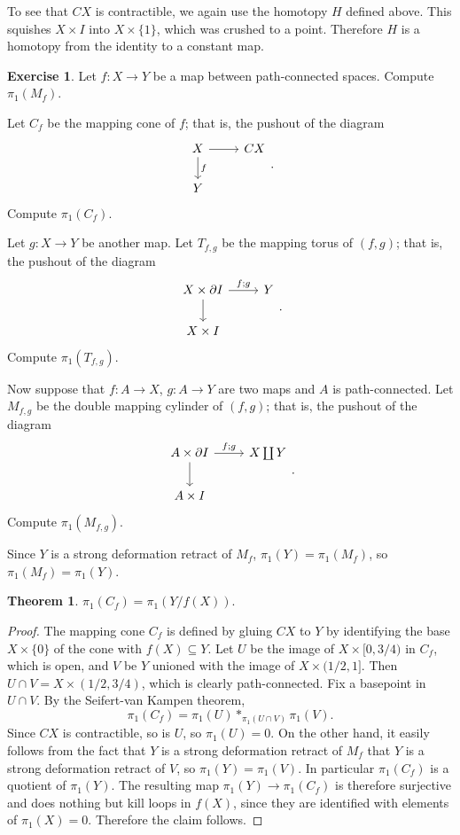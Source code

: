 \documentclass[10pt]{article}
\theoremstyle{definition}
\newtheorem{exer}{Exercise}
\newtheorem{theorem}[lemma]{Theorem}
\begin{document}
To see that $CX$ is contractible, we again use the homotopy $H$ defined above. This squishes $X \times I$ into $X \times \{1\}$, which was crushed to a point. Therefore $H$ is a homotopy from the identity to a constant map.

\begin{exer}
Let $f: X \to Y$ be a map between path-connected spaces. Compute $\pi_1(M_f)$.

Let $C_f$ be the mapping cone of $f$; that is, the pushout of the diagram
$$\begin{tikzcd}X \arrow[r] \arrow[d,"f"] & CX\\ Y\end{tikzcd}.$$
Compute $\pi_1(C_f)$.

Let $g: X \to Y$ be another map. Let $T_{f,g}$ be the mapping torus of $(f,g)$; that is, the pushout of the diagram
$$\begin{tikzcd}
X \times \partial I \arrow[r,"f;g"] \arrow[d] & Y\\
X \times I\end{tikzcd}.$$
Compute $\pi_1(T_{f,g})$.

Now suppose that $f: A \to X$, $g: A \to Y$ are two maps and $A$ is path-connected. Let $M_{f,g}$ be the double mapping cylinder of $(f,g)$; that is, the pushout of the diagram
$$\begin{tikzcd}
A \times \partial I \arrow[r,"f;g"] \arrow[d] & X \coprod Y \\
A \times I\end{tikzcd}.$$
Compute $\pi_1(M_{f,g})$.
\end{exer}

Since $Y$ is a strong deformation retract of $M_f$, $\pi_1(Y) = \pi_1(M_f)$, so $\pi_1(M_f) = \pi_1(Y)$.

\begin{theorem}
$\pi_1(C_f) = \pi_1(Y/f(X))$.
\end{theorem}
\begin{proof}
The mapping cone $C_f$ is defined by gluing $CX$ to $Y$ by identifying the base $X \times \{0\}$ of the cone with $f(X) \subseteq Y$.
Let $U$ be the image of $X \times [0, 3/4)$ in $C_f$, which is open, and $V$ be $Y$ unioned with the image of $X \times (1/2, 1]$.
Then $U \cap V = X \times (1/2, 3/4)$, which is clearly path-connected. Fix a basepoint in $U \cap V$.
By the Seifert-van Kampen theorem,
$$\pi_1(C_f) = \pi_1(U) *_{\pi_1(U \cap V)} \pi_1(V).$$
Since $CX$ is contractible, so is $U$, so $\pi_1(U) = 0$.
On the other hand, it easily follows from the fact that $Y$ is a strong deformation retract of $M_f$ that $Y$ is a strong deformation retract of $V$, so $\pi_1(Y) = \pi_1(V)$.
In particular $\pi_1(C_f)$ is a quotient of $\pi_1(Y)$.
The resulting map $\pi_1(Y) \to \pi_1(C_f)$ is therefore surjective and does nothing but kill loops in $f(X)$, since they are identified with elements of $\pi_1(X) = 0$. Therefore the claim follows.
\end{proof}
\end{document}
